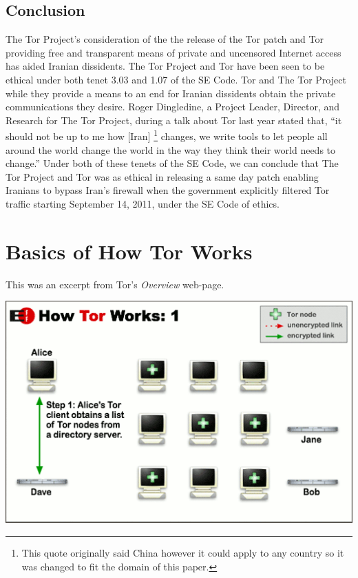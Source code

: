 \documentclass[11pt]{article}
\begin{document}
\begin{multicols}{2}
\section{Conclusion} 

The Tor Project's consideration of the the release of the Tor patch and Tor
providing free and transparent means of private and uncensored Internet access
has aided Iranian dissidents. The Tor Project and Tor have been seen to be
ethical under both tenet 3.03 and 1.07 of the SE Code. Tor and The Tor Project
while they provide a means to an end for Iranian dissidents obtain the private
communications they desire. Roger Dingledine, a Project Leader, Director, and
Research for The Tor Project\cite{Tor:CorePeople}, during a talk about Tor last
year stated that, ``it should not be up to me how [Iran] \footnote{This quote
  originally said China however it could apply to any country so it was changed
  to fit the domain of this paper.} changes, we write tools to let people all
  around the world change the world in the way they think their world needs to
  change.'' \cite{Tor:28c3} Under both of these tenets of the SE Code, we can
  conclude that The Tor Project and Tor was as ethical in releasing a same day
  patch enabling Iranians to bypass Iran's firewall when the government
  explicitly filtered Tor traffic starting September 14, 2011, under the SE
  Code of ethics.


\end{multicols} \newpage

\appendix


\section{Basics of How Tor Works}
\label{Tor:HowTorWorks}

This was an excerpt from Tor's \textit{Overview} web-page.\cite{Tor:Overview}

\begin{center}
\includegraphics[natwidth=510bp,natheight=326bp,width= 0.7\linewidth]{appendix/htw1.png}
\end{center}

\end{document}
